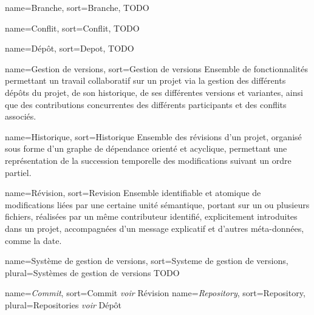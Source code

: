 
{
name=Branche,
sort=Branche,
}
{TODO}

{
name=Conflit,
sort=Conflit,
}
{TODO}

{
name=Dépôt,
sort=Depot,
}
{TODO}

{
name=Gestion de versions,
sort=Gestion de versions
}
{Ensemble de fonctionnalités permettant un travail collaboratif sur un projet via la gestion des différents dépôts du projet, de son historique, de ses différentes versions et variantes, ainsi que des contributions concurrentes des différents participants et des conflits associés.}

{
name=Historique,
sort=Historique
}
{Ensemble des révisions d'un projet, organisé sous forme d'un graphe de dépendance orienté et acyclique, permettant une représentation de la succession temporelle des modifications suivant un ordre partiel.}

{
name=Révision,
sort=Revision
}
{Ensemble identifiable et atomique de modifications liées par une certaine unité sémantique, portant sur un ou plusieurs fichiers, réalisées par un même contributeur identifié, explicitement introduites dans un projet, accompagnées d'un message explicatif et d'autres méta-données, comme la date.}

{
  name=Système de gestion de versions,
  sort=Systeme de gestion de versions,
  plural=Systèmes de gestion de versions
}
{TODO}

{
name={\it Commit\/},
sort=Commit
}
{{\it voir\/} Révision}
{
  name={\it Repository\/},
  sort=Repository,
  plural=Repositories
}
{{\it voir\/} Dépôt}